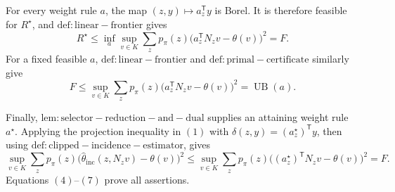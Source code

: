 For every weight rule \(a\), the map \((z,y)\mapsto a_z^{\mathsf T}y\) is Borel.  It is therefore feasible for \(R^{\star}\), and \(\mathrm{def:linear-frontier}\) gives
\[
 R^{\star}
 \le \inf_a\sup_{v\in K}\sum_zp_\pi(z)
 \bigl(a_z^{\mathsf T}N_zv-\theta(v)\bigr)^2
 =F.                                                                              \tag{5}
\]
For a fixed feasible \(a\), \(\mathrm{def:linear-frontier}\) and \(\mathrm{def:primal-certificate}\) similarly give
\[
 F\le
 \sup_{v\in K}\sum_zp_\pi(z)
 \bigl(a_z^{\mathsf T}N_zv-\theta(v)\bigr)^2
 =\operatorname{UB}(a).                                                           \tag{6}
\]

Finally, \(\mathrm{lem:selector-reduction-and-dual}\) supplies an attaining weight rule \(a^{\star}\).  Applying the projection inequality in \((1)\) with \(\delta(z,y)=(a_z^{\star})^{\mathsf T}y\), then using \(\mathrm{def:clipped-incidence-estimator}\), gives
\[
 \sup_{v\in K}\sum_zp_\pi(z)
 \bigl(\widehat\theta_{\mathrm{inc}}(z,N_zv)-\theta(v)\bigr)^2
 \le
 \sup_{v\in K}\sum_zp_\pi(z)
 \bigl((a_z^{\star})^{\mathsf T}N_zv-\theta(v)\bigr)^2
 =F.                                                                              \tag{7}
\]
Equations \((4)\)--\((7)\) prove all assertions.